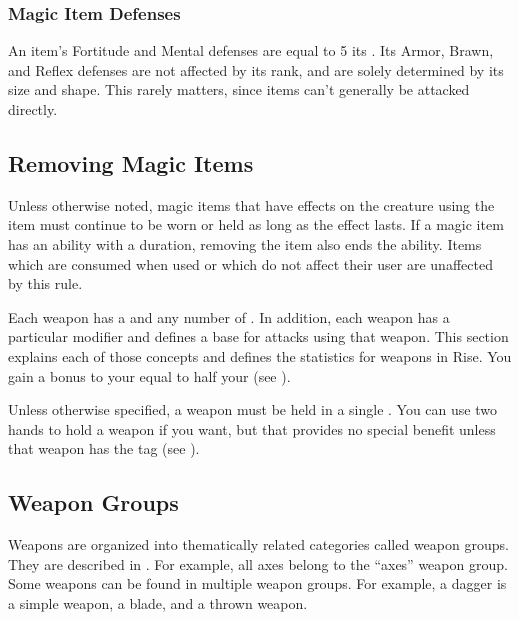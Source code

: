     \subsubsection{Magic Item Defenses}\label{Magic Item Defenses}
      An item's Fortitude and Mental defenses are equal to 5 \add its .
      Its Armor, Brawn, and Reflex defenses are not affected by its rank, and are solely determined by its size and shape.
      This rarely matters, since  items can't generally be attacked directly.

  \subsection{Removing Magic Items}
    Unless otherwise noted, magic items that have effects on the creature using the item must continue to be worn or held as long as the effect lasts.
    If a magic item has an ability with a duration, removing the item also ends the ability.
    Items which are consumed when used or which do not affect their user are unaffected by this rule.

\newpage
{}

  Each weapon has a  and any number of .
  In addition, each weapon has a particular  modifier and defines a base  for attacks using that weapon.
  This section explains each of those concepts and defines the statistics for weapons in Rise.
  You gain a bonus to your  equal to half your  (see ).

  Unless otherwise specified, a weapon must be held in a single .
  You can use two hands to hold a weapon if you want, but that provides no special benefit unless that weapon has the  tag (see ).

  \subsection{Weapon Groups}\label{Weapon Groups}
    Weapons are organized into thematically related categories called weapon groups. They are described in . For example, all axes belong to the ``axes'' weapon group. Some weapons can be found in multiple weapon groups. For example, a dagger is a simple weapon, a blade, and a thrown weapon.

